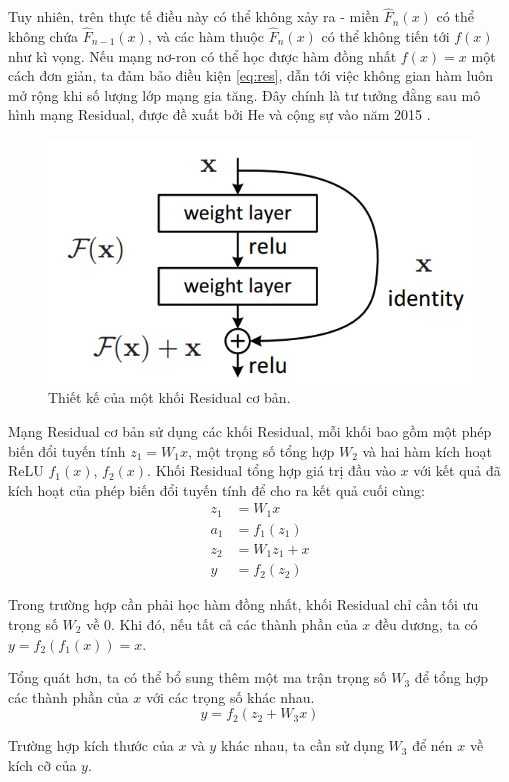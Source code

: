 \documentclass[12pt]{extreport}
\begin{document}
Tuy nhiên, trên thực tế điều này có thể không xảy ra - miền $ \hat{F}_n(x) $ có thể không chứa $ \hat{F}_{n-1}(x) $, và các hàm thuộc $ \hat{F}_n(x) $ có thể không tiến tới $ f(x) $ như kì vọng. Nếu mạng nơ-ron có thể học được hàm đồng nhất $ f(x) = x $ một cách đơn giản, ta đảm bảo điều kiện \ref{eq:res}, dẫn tới việc không gian hàm luôn mở rộng khi số lượng lớp mạng gia tăng. Đây chính là tư tưởng đằng sau mô hình mạng Residual, được đề xuất bởi He và cộng sự vào năm 2015 \cite{he2015deep}.

\begin{figure}[H]
    \centering
    \includegraphics[width=0.7\linewidth]{figure33.png}
    \caption{Thiết kế của một khối Residual cơ bản.}
\end{figure}

Mạng Residual cơ bản sử dụng các khối Residual, mỗi khối bao gồm một phép biến đổi tuyến tính $ z_1 = W_1x $, một trọng số tổng hợp $ W_2 $ và hai hàm kích hoạt ReLU $ f_1(x) $, $ f_2(x) $. Khối Residual tổng hợp giá trị đầu vào $ x $ với kết quả đã kích hoạt của phép biến đổi tuyến tính để cho ra kết quả cuối cùng:
\begin{align*}
    z_1 & = W_1x       \\
    a_1 & = f_1(z_1)   \\
    z_2 & = W_1z_1 + x \\
    y   & = f_2(z_2)
\end{align*}

Trong trường hợp cần phải học hàm đồng nhất, khối Residual chỉ cần tối ưu trọng số $ W_2 $ về 0. Khi đó, nếu tất cả các thành phần của $ x $ đều dương, ta có $ y = f_2(f_1(x)) = x $.

Tổng quát hơn, ta có thể bổ sung thêm một ma trận trọng số $ W_3 $ để tổng hợp các thành phần của $ x $ với các trọng số khác nhau.
$$ y = f_2(z_2 + W_3x) $$

Trường hợp kích thước của $ x $ và $ y $ khác nhau, ta cần sử dụng $ W_3 $ để nén $ x $ về kích cỡ của $ y $.
\end{document}
